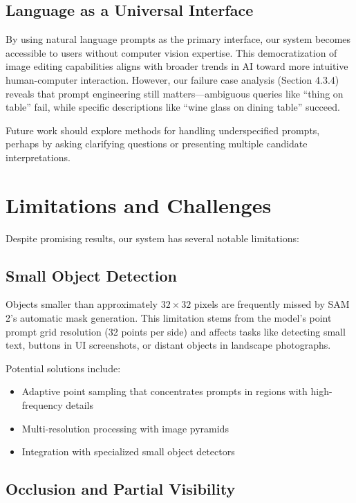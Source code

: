 \subsection{Language as a Universal Interface}

By using natural language prompts as the primary interface, our system becomes accessible to users without computer vision expertise. This democratization of image editing capabilities aligns with broader trends in AI toward more intuitive human-computer interaction. However, our failure case analysis (Section 4.3.4) reveals that prompt engineering still matters—ambiguous queries like ``thing on table'' fail, while specific descriptions like ``wine glass on dining table'' succeed.

Future work should explore methods for handling underspecified prompts, perhaps by asking clarifying questions or presenting multiple candidate interpretations.

\section{Limitations and Challenges}

Despite promising results, our system has several notable limitations:

\subsection{Small Object Detection}

Objects smaller than approximately $32 \times 32$ pixels are frequently missed by SAM 2's automatic mask generation. This limitation stems from the model's point prompt grid resolution (32 points per side) and affects tasks like detecting small text, buttons in UI screenshots, or distant objects in landscape photographs.

Potential solutions include:
\begin{itemize}
    \item Adaptive point sampling that concentrates prompts in regions with high-frequency details
    \item Multi-resolution processing with image pyramids
    \item Integration with specialized small object detectors
\end{itemize}

\subsection{Occlusion and Partial Visibility}


